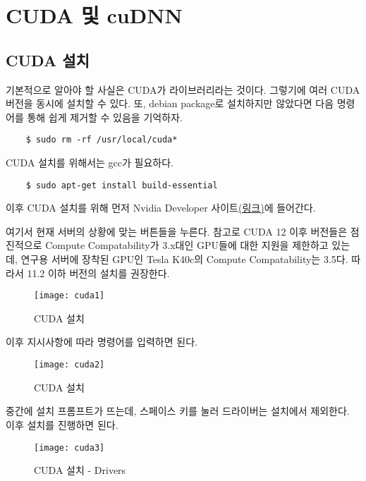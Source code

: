 \section{CUDA 및 cuDNN}
\subsection{CUDA 설치}
기본적으로 알아야 할 사실은 CUDA가 라이브러리라는 것이다. 그렇기에 여러 CUDA 버전을 동시에 설치할 수 있다. 또, debian package로 설치하지만 않았다면 다음 명령어를 통해 쉽게 제거할 수 있음을 기억하자.
\begin{lstlisting}
    $ sudo rm -rf /usr/local/cuda*
\end{lstlisting}

CUDA 설치를 위해서는 gcc가 필요하다.
\begin{lstlisting}
    $ sudo apt-get install build-essential
\end{lstlisting}
이후 CUDA 설치를 위해 먼저 Nvidia Developer 사이트\href{https://developer.nvidia.com/cuda-toolkit-archive}{(링크)}에 들어간다.

여기서 현재 서버의 상황에 맞는 버튼들을 누른다. 참고로 CUDA 12 이후 버전들은 점진적으로 Compute Compatability가 3.x대인 GPU들에 대한 지원을 제한하고 있는데, 연구용 서버에 장착된 GPU인 Tesla K40c의 Compute Compatability는 3.5다. 따라서 11.2 이하 버전의 설치를 권장한다.
\begin{figure}[H]
	\begin{center}
        \texttt{[image: cuda1]}
        \caption{CUDA 설치}
    \end{center}
\end{figure}
이후 지시사항에 따라 명령어를 입력하면 된다.
\begin{figure}[H]
	\begin{center}
        \texttt{[image: cuda2]}
        \caption{CUDA 설치}
    \end{center}
\end{figure}


중간에 설치 프롬프트가 뜨는데, 스페이스 키를 눌러 드라이버는 설치에서 제외한다. 이후 설치를 진행하면 된다.
\begin{figure}[H]
	\begin{center}
        \texttt{[image: cuda3]}
        \caption{CUDA 설치 - Drivers}
    \end{center}
\end{figure}

